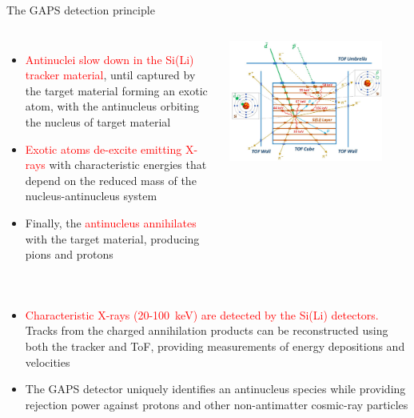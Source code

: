 \documentclass[aspectratio=169,xcolor=dvipsnamesz]{beamer} %
\begin{document}
\begin{frame}{The GAPS detection principle}
    \fontsize{9pt}{1}\selectfont
    \begin{columns}
            \begin{itemize}
                \setlength\itemsep{1em}
                \item \textcolor{Red}{Antinuclei slow down in the Si(Li) tracker material}, until captured by the target material forming an exotic atom, with the antinucleus orbiting the nucleus of target material
                \item \textcolor{Red}{Exotic atoms de-excite emitting X-rays} with characteristic energies that depend on the reduced mass of the nucleus-antinucleus system
                \item Finally, the \textcolor{Red}{antinucleus annihilates} with the target material, producing pions and protons
            \end{itemize}

            \centering
            \includegraphics[width=0.85\textwidth]{images/backup_slides/tracker_scheme_manghisoni.jpg}
    \end{columns}

    \vspace{0.1cm}
    \begin{columns}
            \begin{itemize}
                \item \textcolor{Red}{Characteristic X-rays (20-\SI{100}{\kilo\electronvolt}) are detected by the Si(Li) detectors.} Tracks from the charged annihilation products can be reconstructed using both the tracker and ToF, providing measurements of energy depositions and velocities
                \item The GAPS detector uniquely identifies an antinucleus species while providing rejection power against protons and other non-antimatter cosmic-ray particles
            \end{itemize}
    \end{columns}
\end{frame}
\end{document}
